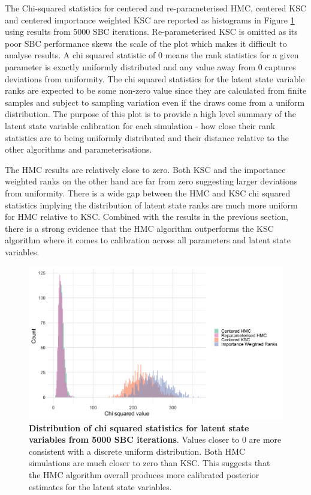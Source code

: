 \documentclass[12pt, a4paper]{article}
\begin{document}
    The Chi-squared statistics for centered and re-parameterised HMC, centered KSC and centered importance weighted KSC are reported as histograms in Figure \ref{fig:allchisq} using results from 5000 SBC iterations. Re-parameterised KSC is omitted as its poor SBC performance skews the scale of the plot which makes it difficult to analyse results. A chi squared statistic of 0 means the rank statistics for a given parameter is exactly uniformly distributed and any value away from 0 captures deviations from uniformity. The chi squared statistics for the latent state variable ranks are expected to be some non-zero value since they are calculated from finite samples and subject to sampling variation even if the draws come from a uniform distribution. The purpose of this plot is to provide a high level summary of the latent state variable calibration for each simulation - how close their rank statistics are to being uniformly distributed and their distance relative to the other algorithms and parameterisations. 
    
    The HMC results are relatively close to zero. Both KSC and the importance weighted ranks on the other hand are far from zero suggesting larger deviations from uniformity. There is a wide gap between the HMC and KSC chi squared statistics implying the distribution of latent state ranks are much more  uniform for HMC relative to KSC. Combined with the results in the previous section, there is a strong evidence that the HMC algorithm outperforms the KSC algorithm where it comes to calibration across all parameters and latent state variables.

    \begin{figure}[H]
        \centering
        \includegraphics[scale=0.1]{results/dist_chisq_all.png}
        \caption{\textbf{Distribution of chi squared statistics for latent state variables from 5000 SBC iterations}. Values closer to 0 are more consistent with a discrete uniform distribution. Both HMC simulations are much closer to zero than KSC. This suggests that the HMC algorithm overall produces more calibrated posterior estimates for the latent state variables.}
        \label{fig:allchisq}
    \end{figure}
\end{document}
